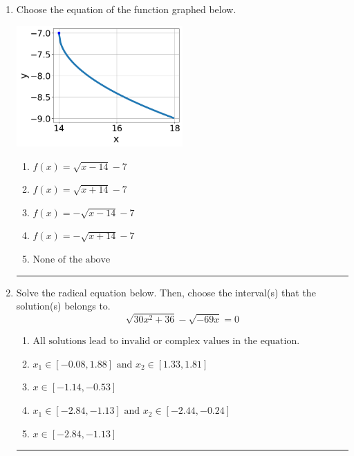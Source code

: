 \documentclass[14pt]{extbook}
\newcommand{\litem}[1]{\item#1\hspace*{-1cm}\rule{\textwidth}{0.4pt}}
\begin{document}
\begin{enumerate}
{\begin{enumerate}[label=\Alph*.]
\end{enumerate} }
\litem{
Choose the equation of the function graphed below.
\begin{center}
    \includegraphics[width=0.5\textwidth]{../Figures/radicalGraphToEquationCopyB.png}
\end{center}
\begin{enumerate}[label=\Alph*.]
\item \( f(x) = \sqrt{x - 14} - 7 \)
\item \( f(x) = \sqrt{x + 14} - 7 \)
\item \( f(x) = - \sqrt{x - 14} - 7 \)
\item \( f(x) = - \sqrt{x + 14} - 7 \)
\item \( \text{None of the above} \)

\end{enumerate} }
\litem{
Solve the radical equation below. Then, choose the interval(s) that the solution(s) belongs to.\[ \sqrt{30 x^2 + 36} - \sqrt{-69 x} = 0 \]\begin{enumerate}[label=\Alph*.]
\item \( \text{All solutions lead to invalid or complex values in the equation.} \)
\item \( x_1 \in [-0.08, 1.88] \text{ and } x_2 \in [1.33,1.81] \)
\item \( x \in [-1.14,-0.53] \)
\item \( x_1 \in [-2.84, -1.13] \text{ and } x_2 \in [-2.44,-0.24] \)
\item \( x \in [-2.84,-1.13] \)


\end{enumerate}}
\end{enumerate}
\end{document}
